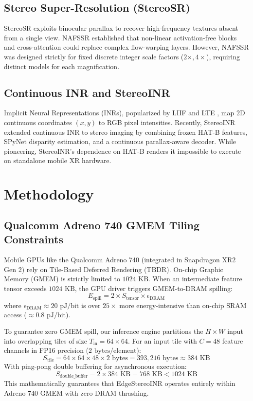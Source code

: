 \documentclass[10pt,journal,compsoc]{IEEEtran}
\begin{document}
\subsection{Stereo Super-Resolution (StereoSR)}
StereoSR exploits binocular parallax to recover high-frequency textures absent from a single view. NAFSSR \cite{nafssr2022} established that non-linear activation-free blocks and cross-attention could replace complex flow-warping layers. However, NAFSSR was designed strictly for fixed discrete integer scale factors ($2\times, 4\times$), requiring distinct models for each magnification.

\subsection{Continuous INR and StereoINR}
Implicit Neural Representations (INRs), popularized by LIIF \cite{liif2021} and LTE \cite{lte2022}, map 2D continuous coordinates $(x, y)$ to RGB pixel intensities. Recently, StereoINR \cite{stereoinr2025} extended continuous INR to stereo imaging by combining frozen HAT-B features, SPyNet disparity estimation, and a continuous parallax-aware decoder. While pioneering, StereoINR's dependence on HAT-B renders it impossible to execute on standalone mobile XR hardware.

\section{Methodology}
\label{sec:methodology}

\subsection{Qualcomm Adreno 740 GMEM Tiling Constraints}
Mobile GPUs like the Qualcomm Adreno 740 (integrated in Snapdragon XR2 Gen 2) rely on Tile-Based Deferred Rendering (TBDR). On-chip Graphic Memory (GMEM) is strictly limited to $1024\text{ KB}$. When an intermediate feature tensor exceeds $1024\text{ KB}$, the GPU driver triggers GMEM-to-DRAM spilling:
\begin{equation}
E_{\text{spill}} = 2 \times S_{\text{tensor}} \times \epsilon_{\text{DRAM}}
\end{equation}
where $\epsilon_{\text{DRAM}} \approx 20\text{ pJ/bit}$ is over $25\times$ more energy-intensive than on-chip SRAM access ($\approx 0.8\text{ pJ/bit}$).

To guarantee zero GMEM spill, our inference engine partitions the $H \times W$ input into overlapping tiles of size $T_{\text{in}} = 64 \times 64$. For an input tile with $C = 48$ feature channels in FP16 precision ($2\text{ bytes/element}$):
\begin{equation}
S_{\text{tile}} = 64 \times 64 \times 48 \times 2\text{ bytes} = 393,216\text{ bytes} \approx 384\text{ KB}
\end{equation}
With ping-pong double buffering for asynchronous execution:
\begin{equation}
S_{\text{double\_buffer}} = 2 \times 384\text{ KB} = 768\text{ KB} < 1024\text{ KB}
\end{equation}
This mathematically guarantees that EdgeStereoINR operates entirely within Adreno 740 GMEM with zero DRAM thrashing.
\end{document}
